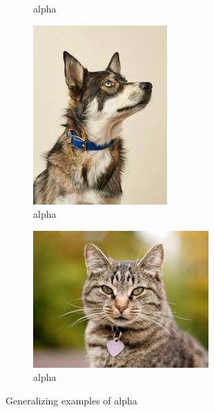 \begin{figure}
\begin{subfigure}{0.2\columnwidth}
    \caption{alpha}
  \end{subfigure}
  \hfill
  \begin{subfigure}{0.2\columnwidth}
    \includegraphics[width=\columnwidth]{fig/dog2-collar.jpeg}
    \caption{alpha}
  \end{subfigure}
  \hfill
  \begin{subfigure}{0.2\columnwidth}
    \includegraphics[width=\columnwidth]{fig/cat2-collar.jpeg}
    \caption{alpha}
  \end{subfigure}
  \caption{Generalizing examples of alpha}
\end{figure}
